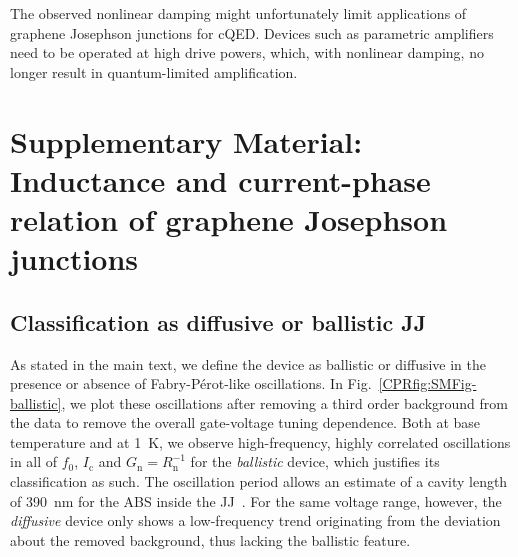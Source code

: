 The observed nonlinear damping might unfortunately limit applications of graphene Josephson junctions for cQED.
%
Devices such as parametric amplifiers need to be operated at high drive powers, which, with nonlinear damping, no longer result in quantum-limited amplification.

%


\clearpage
\pagebreak




\section{Supplementary Material: Inductance and current-phase relation of graphene Josephson junctions}\label{sec:SM}

\subsection{Classification as diffusive or ballistic JJ}\label{sec:SMballistic}

As stated in the main text, we define the device as ballistic or diffusive in the presence or absence of Fabry-Pérot-like oscillations.
%
In Fig.~\ref{CPRfig:SMFig-ballistic}, we plot these oscillations after removing a third order background from the data to remove the overall gate-voltage tuning dependence.
%
Both at base temperature and at \SI{1}{\kelvin}, we observe high-frequency, highly correlated oscillations in all of $f_0$, $I_\text{c}$ and $G_\text{n}=R_\text{n}^{-1}$ for the \textit{ballistic} device, which justifies its classification as such.
%
The oscillation period allows an estimate of a cavity length of \SI{390}{\nano\meter} for the ABS inside the JJ~\cite{schmidtBallisticGrapheneSuperconducting2018}.
%
For the same voltage range, however, the \textit{diffusive} device only shows a low-frequency trend originating from the deviation about the removed background, thus lacking the ballistic feature.

